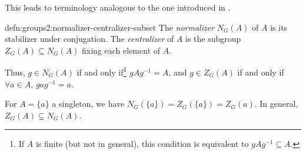 This leads to terminology analogous to the one introduced in
.
\begin{defn}{}{defn:groups2:normalizer-centralizer-subset}
  The \emph{normalizer} $N_G(A)$ of $A$ is its stabilizer under
  conjugation.  The \emph{centralizer} of $A$ is the subgroup
  $Z_G(A) \subseteq N_G(A)$ fixing each element of $A$.
\end{defn}
Thus, $g \in N_G(A)$ if and only if\footnote{If $A$ is finite (but not
  in general), this condition is equivalent to
  $gAg^{-1} \subseteq A$.}  $gAg^{-1} = A$, and $g \in Z_G(A)$ if and
only if $\forall a \in A$, $gag^{-1} = a$.

For $A = \{a\}$ a singleton, we have
$N_G(\{a\}) = Z_G(\{a\}) = Z_G(a)$. In general,
$Z_G(A) \subsetneq N_G(A)$.

